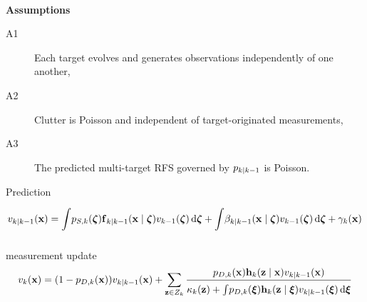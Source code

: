 \documentclass[a4paper]{scrreprt}
\theoremstyle{theorem}
\theoremstyle{definition}
\begin{document}
\ \\
\textbf{Assumptions}\\
\begin{description}
	\item[A1] Each target evolves and generates observations independently of one another,
	\item[A2] Clutter is Poisson and independent of target-originated measurements,
	\item[A3] The predicted multi-target RFS governed by \( p_{k|k-1} \) is Poisson.
\end{description}


Prediction
\begin{equation}\label{eq:phd_filter_prediction}
	v_{\tind|\tind-1}(\inVar) 
	= \integ p_{S,\tind}(\vb{\zeta}) \stFcn_{\tind|\tind-1}(\inVar \mid \vb{\zeta}) v_{\tind-1}(\vb{\zeta}) \dx[\vb{\zeta}]
	+ \integ \beta_{\tind|\tind-1}(\inVar \mid \vb{\zeta}) v_{\tind-1}(\vb{\zeta}) \dx[\vb{\zeta}] + \gamma_\tind(\inVar)
\end{equation}

measurement update
\begin{equation}\label{eq:phd_filter_update}
	v_\tind(\inVar) = (1 - p_{D,\tind}(\inVar))v_{\tind|\tind-1}(\inVar) + \sum\limits_{\msVar \in \msSet_\tind} \frac{p_{D,\tind}(\inVar)\msFcn_\tind(\msVar \mid \inVar) v_{\tind|\tind-1}(\inVar)}{\kappa_\tind(\msVar) + \integ p_{D,\tind}(\inVarU) \msFcn_\tind(\msVar\mid\inVarU) v_{\tind|\tind-1}(\inVarU) \dx[\inVarU]} 
\end{equation}
\end{document}
